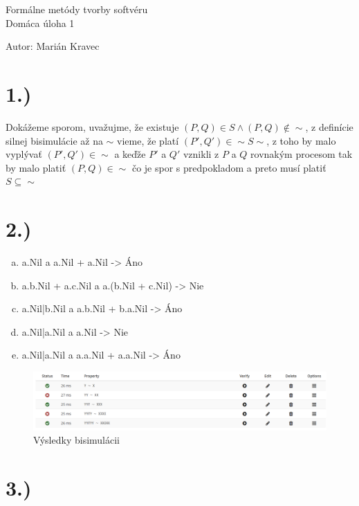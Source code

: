 \documentclass[a4paper]{article}
\begin{document}
 
	
\pagestyle{plain}

\begin{center}
	\sc\large
	Formálne metódy tvorby softvéru\\
	Domáca úloha 1 
\end{center}

Autor: Marián Kravec

\section{1.)}

Dokážeme sporom, uvažujme, že existuje $(P,Q) \in S \land (P,Q) \notin \sim$, z definície silnej bisimulácie až na $\sim$ vieme, že platí $(P',Q') \in \sim S \sim$, z toho by malo vyplývať $(P',Q') \in \sim$ a keďže $P'$ a $Q'$ vznikli z $P$ a $Q$ rovnakým procesom tak by malo platiť $(P,Q) \in \sim$ čo je spor s predpokladom a preto musí platiť $S \subseteq \sim$

\section{2.)}

\begin{enumerate}[a)]
	\item a.Nil a a.Nil + a.Nil  ->  Áno
	\item a.b.Nil + a.c.Nil a a.(b.Nil + c.Nil)  -> Nie
	\item a.Nil|b.Nil a a.b.Nil + b.a.Nil  -> Áno
	\item a.Nil|a.Nil a a.Nil  -> Nie
	\item a.Nil|a.Nil a a.a.Nil + a.a.Nil  -> Áno
\end{enumerate}

\begin{figure}[!h]
	\centering
	\includegraphics[width=1\textwidth]{uloha_2.png}
	\caption{Výsledky bisimulácii}
\end{figure}

\section{3.)}
\end{document}
